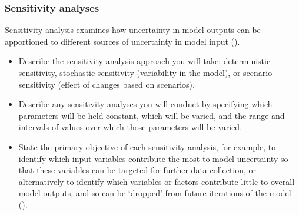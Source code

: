 \documentclass[
]{article}
\providecommand{\tightlist}{%
  \setlength{\itemsep}{0pt}\setlength{\parskip}{0pt}}
\begin{document}
\subsubsection{Sensitivity analyses}\label{sensitivity-analyses}

\begin{tcolorbox}[enhanced jigsaw, opacitybacktitle=0.6, bottomrule=.15mm, leftrule=.75mm, rightrule=.15mm, colbacktitle=quarto-callout-note-color!10!white, toprule=.15mm, titlerule=0mm, left=2mm, colframe=quarto-callout-note-color-frame, breakable, title=\textcolor{quarto-callout-note-color}{\faInfo}\hspace{0.5em}{Explanation}, opacityback=0, coltitle=black, bottomtitle=1mm, colback=white, toptitle=1mm, arc=.35mm]

Sensitivity analysis examines how uncertainty in model outputs can be
apportioned to different sources of uncertainty in model input
().

\end{tcolorbox}

\begin{tcolorbox}[enhanced jigsaw, opacitybacktitle=0.6, bottomrule=.15mm, leftrule=.75mm, rightrule=.15mm, colbacktitle=quarto-callout-caution-color!10!white, toprule=.15mm, titlerule=0mm, left=2mm, colframe=quarto-callout-caution-color-frame, breakable, title=\textcolor{quarto-callout-caution-color}{\faFire}\hspace{0.5em}{Preregistration Item}, opacityback=0, coltitle=black, bottomtitle=1mm, colback=white, toptitle=1mm, arc=.35mm]

\begin{itemize}
\tightlist
\item[$\square$]
  Describe the sensitivity analysis approach you will take:
  deterministic sensitivity, stochastic sensitivity (variability in the
  model), or scenario sensitivity (effect of changes based on
  scenarios).
\item[$\square$]
  Describe any sensitivity analyses you will conduct by specifying which
  parameters will be held constant, which will be varied, and the range
  and intervals of values over which those parameters will be varied.
\item[$\square$]
  State the primary objective of each sensitivity analysis, for example,
  to identify which input variables contribute the most to model
  uncertainty so that these variables can be targeted for further data
  collection, or alternatively to identify which variables or factors
  contribute little to overall model outputs, and so can be `dropped'
  from future iterations of the model
  ().
\end{itemize}

\end{tcolorbox}
\end{document}
